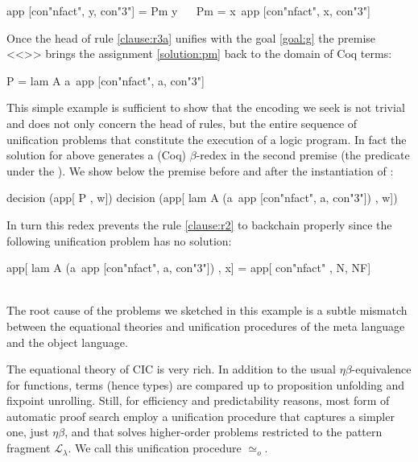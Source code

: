 \documentclass[sigconf,natbib=false,review]{acmart}
\newcommand{\UnifRel}{\ensuremath{\simeq}}
\newcommand{\Uo}{\ensuremath{\UnifRel_o}\xspace}
\newcommand{\llambda}{\ensuremath{\mathcal{L}_\lambda}\xspace}
\begin{document}
\begin{elpicode}
app [con"nfact", y, con"3"] = Pm y                    ~~
Pm = x\ app [con"nfact", x, con"3"]                   ~~
\end{elpicode}

\noindent
Once the head of rule \ref{clause:r3a} unifies with the goal \ref{goal:g}
the premise <<>> brings the assignment \ref{solution:pm}
back to the domain  of Coq terms:

\begin{elpicode}
P = lam A a\ app [con"nfact", a, con"3"]
\end{elpicode}

\noindent
This simple example is sufficient to show that the encoding we seek
is not trivial and does not only concern the head of rules, but the entire sequence
of unification problems that constitute the execution of a logic program.
In fact
the solution for  above generates a
(Coq) $\beta$-redex in the second premise (the predicate
under the \hspace{-0.4em}). We show below the premise before and
after the instantiation of :

\begin{elpicode}
decision (app[                    P                   , w])
decision (app[ lam A (a\ app [con"nfact", a, con"3"]) , w])
\end{elpicode}

\noindent
In turn this redex prevents the rule \ref{clause:r2} to backchain properly since
the following unification problem has no solution:

\begin{elpicode}
app[ lam A (a\ app [con"nfact", a, con"3"]) , x] =
app[ con"nfact"                             , N, NF]
\end{elpicode}
\noindent
~\\
The root cause of the problems we sketched in this example
is a subtle mismatch between the equational theories and
unification procedures of the meta language and the object language.

The equational theory of CIC is very rich. In
addition to the usual $\eta\beta$-equivalence for functions, terms (hence types)
are compared up to proposition unfolding and fixpoint unrolling. Still,
for efficiency and predictability reasons, most form of automatic proof search
employ a unification procedure that captures a simpler one,
just $\eta\beta$, and that solves higher-order problems
restricted to the pattern fragment \llambda.
We call this unification procedure \Uo{}.
\end{document}
